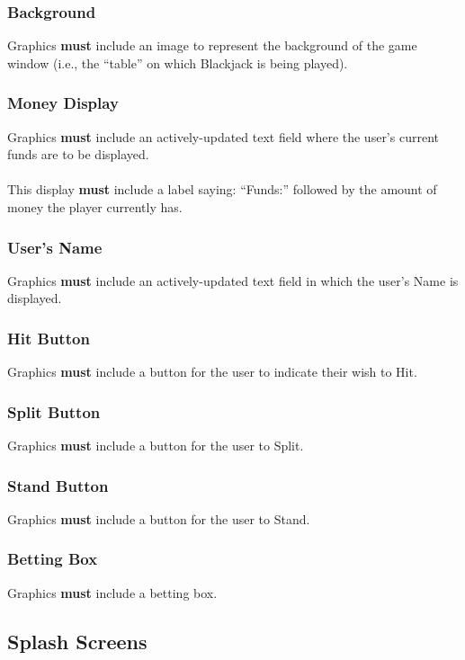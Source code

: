 \documentclass{article}
\begin{document}
\subsubsection{Background}Graphics \textbf{must} include an image to represent the background of the game window (i.e., the “table” on which Blackjack is being played).  


\subsubsection{Money Display}Graphics \textbf{must} include an actively-updated text field where the user’s current funds are to be displayed.
\paragraph{}This display \textbf{must} include a label saying: “Funds:” followed by the amount of money the player currently has.


\subsubsection{User’s Name}Graphics \textbf{must} include an actively-updated text field in which the user’s Name is displayed.


\subsubsection{ Hit Button}Graphics \textbf{must} include a button for the user to indicate their wish to Hit.


\subsubsection{Split Button}Graphics \textbf{must} include a button for the user to Split.


\subsubsection{Stand Button}Graphics \textbf{must} include a button for the user to Stand.


\subsubsection{ Betting Box}Graphics \textbf{must} include a betting box.

\subsection{Splash Screens}
\end{document}
